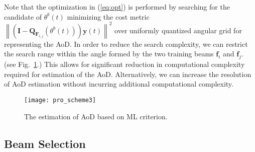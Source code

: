 \documentclass[conference]{IEEEtran}
\begin{document}
Note that the optimization in (\ref{eq:opt}) is performed by searching for the candidate of $\theta^{b}(t)$ minimizing the cost metric $ \left\| \left(\mathbf{I}- \mathbf{Q}_{\mathbf{F}_{i,j}}(\theta^{b}(t)) \right)\mathbf{y}(t) \right\|^2$ over
uniformly quantized angular grid for representing the AoD.
In order to reduce the search complexity, we can restrict the search range within the angle formed by the two training beams $\mathbf{f}_i$ and $\mathbf{f}_j$. (see Fig.~\ref{fig:scheme3}.)  This allows for significant reduction in computational complexity required for estimation of the AoD. Alternatively, we can increase the resolution of AoD estimation without incurring additional computational complexity.

\begin{figure} [t]
 \centering
 \texttt{[image: pro\_scheme3]}
 \caption{The estimation of AoD based on ML criterion.} \label{fig:scheme3}
\end{figure}

\subsection{Beam Selection}
\end{document}

